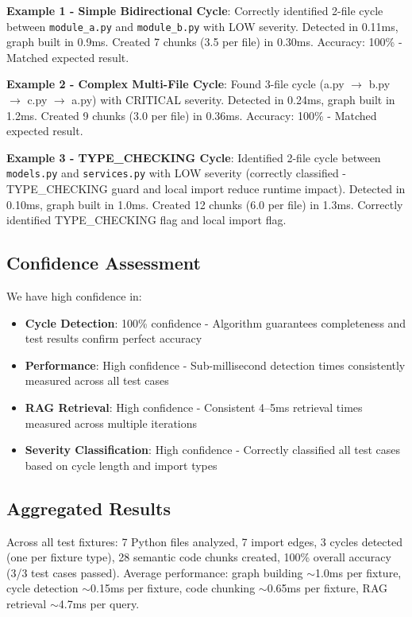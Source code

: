 \documentclass[paper=a4, fontsize=11pt]{scrartcl} %
\begin{document}
\textbf{Example 1 - Simple Bidirectional Cycle}: Correctly identified 2-file cycle between \texttt{module\_a.py} and \texttt{module\_b.py} with LOW severity. Detected in 0.11ms, graph built in 0.9ms. Created 7 chunks (3.5 per file) in 0.30ms. Accuracy: 100\% - Matched expected result.

\textbf{Example 2 - Complex Multi-File Cycle}: Found 3-file cycle (a.py $\rightarrow$ b.py $\rightarrow$ c.py $\rightarrow$ a.py) with CRITICAL severity. Detected in 0.24ms, graph built in 1.2ms. Created 9 chunks (3.0 per file) in 0.36ms. Accuracy: 100\% - Matched expected result.

\textbf{Example 3 - TYPE\_CHECKING Cycle}: Identified 2-file cycle between \texttt{models.py} and \texttt{services.py} with LOW severity (correctly classified - TYPE\_CHECKING guard and local import reduce runtime impact). Detected in 0.10ms, graph built in 1.0ms. Created 12 chunks (6.0 per file) in 1.3ms. Correctly identified TYPE\_CHECKING flag and local import flag.

\subsection{Confidence Assessment}

We have high confidence in:
\begin{itemize}
    \item \textbf{Cycle Detection}: 100\% confidence - Algorithm guarantees completeness and test results confirm perfect accuracy
    \item \textbf{Performance}: High confidence - Sub-millisecond detection times consistently measured across all test cases
    \item \textbf{RAG Retrieval}: High confidence - Consistent 4--5ms retrieval times measured across multiple iterations
    \item \textbf{Severity Classification}: High confidence - Correctly classified all test cases based on cycle length and import types
\end{itemize}

\subsection{Aggregated Results}

Across all test fixtures: 7 Python files analyzed, 7 import edges, 3 cycles detected (one per fixture type), 28 semantic code chunks created, 100\% overall accuracy (3/3 test cases passed). Average performance: graph building $\sim$1.0ms per fixture, cycle detection $\sim$0.15ms per fixture, code chunking $\sim$0.65ms per fixture, RAG retrieval $\sim$4.7ms per query.
\end{document}
